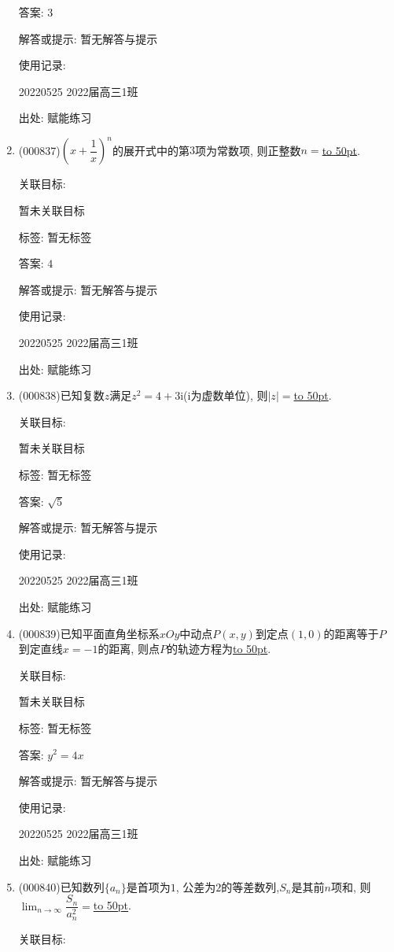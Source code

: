 \documentclass[10pt,a4paper]{article}
\newcommand{\blank}[1]{\underline{\hbox to #1pt{}}}
\begin{document}
\begin{enumerate}[1.]
答案: $3$

解答或提示: 暂无解答与提示

使用记录:

20220525	2022届高三1班	


出处: 赋能练习
\item { (000837)}$(x+\dfrac1x)^n$的展开式中的第$3$项为常数项, 则正整数$n=$\blank{50}.


关联目标:

暂未关联目标



标签: 暂无标签

答案: $4$

解答或提示: 暂无解答与提示

使用记录:

20220525	2022届高三1班	


出处: 赋能练习
\item { (000838)}已知复数$z$满足${z^2}=4+3\mathrm{i}$($\mathrm{i}$为虚数单位), 则$|z|=$\blank{50}.


关联目标:

暂未关联目标



标签: 暂无标签

答案: $\sqrt 5$

解答或提示: 暂无解答与提示

使用记录:

20220525	2022届高三1班	


出处: 赋能练习
\item { (000839)}已知平面直角坐标系$xOy$中动点$P(x,y)$到定点$(1,0)$的距离等于$P$到定直线$x=-1$的距离, 则点$P$的轨迹方程为\blank{50}.


关联目标:

暂未关联目标



标签: 暂无标签

答案: $y^2=4x$

解答或提示: 暂无解答与提示

使用记录:

20220525	2022届高三1班	


出处: 赋能练习
\item { (000840)}已知数列$\{a_n\}$是首项为$1$, 公差为$2$的等差数列,$S_n$是其前$n$项和, 则$\displaystyle\lim_{n\to\infty}\dfrac{S_n}{a_n^2}=$\blank{50}.


关联目标:


\end{enumerate}
\end{document}
